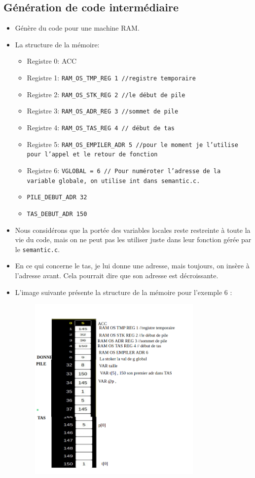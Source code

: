 \documentclass[a4paper,10pt]{article}
\begin{document}
\subsection*{Génération de code intermédiaire}
\begin{itemize}
    \item Génère du code pour une machine RAM.
    \item La structure de la mémoire:
    \begin{itemize}
        \item Registre 0: ACC
        \item Registre 1: \texttt{RAM\_OS\_TMP\_REG 1 //registre temporaire}
        \item Registre 2: \texttt{RAM\_OS\_STK\_REG 2 //le début de pile}
        \item Registre 3: \texttt{RAM\_OS\_ADR\_REG 3 //sommet de pile}
        \item Registre 4: \texttt{RAM\_OS\_TAS\_REG 4 // début de tas}
        \item Registre 5: \texttt{RAM\_OS\_EMPILER\_ADR 5 //pour le moment je l'utilise pour l'appel et le retour de fonction}
        \item Registre 6: \texttt{VGLOBAL = 6 // Pour numéroter l'adresse de la variable globale, on utilise int dans semantic.c.}
        \item \texttt{PILE\_DEBUT\_ADR 32}
        \item \texttt{TAS\_DEBUT\_ADR 150}
    \end{itemize}
    \item Nous considérons que la portée des variables locales reste restreinte à toute la vie du code, mais on ne peut pas les utiliser juste dans leur fonction gérée par le \texttt{semantic.c}.
    \item En ce qui concerne le tas, je lui donne une adresse, mais toujours, on insère à l'adresse avant. Cela pourrait dire que son adresse est décroissante.
    \item L'image suivante présente la structure de la mémoire pour l'exemple 6 :
\begin{figure}[H]
    \centering
    \includegraphics[width=0.8\textwidth]{RAM.png}

\end{figure}
\end{itemize}
\end{document}
